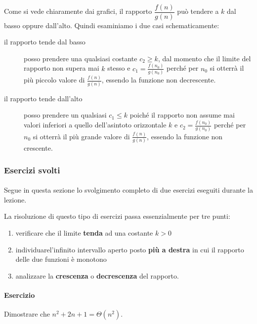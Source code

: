 \documentclass[11pt,a4paper,oneside]{article}
\begin{document}
\paragraph*{}Come si vede chiaramente dai grafici, il rapporto $\dfrac{f(n)}{g(n)}$ può tendere a $k$ dal basso oppure dall'alto. Quindi esaminiamo i due casi schematicamente:
\begin{description}
	\item[il rapporto tende dal basso] posso prendere una qualsiasi costante $c_2 \geq k$, dal momento che il limite del rapporto non supera mai $k$ stesso e $c_1 = \frac{f(n_0)}{g(n_0)}$ perché per $n_0$ si otterrà il più piccolo valore di $\frac{f(n)}{g(n)}$, essendo la funzione non decrescente.
	\item[il rapporto tende dall'alto] posso prendere un qualsiasi $c_1 \leq k$ poiché il rapporto non assume mai valori inferiori a quello dell'asintoto orizzontale $k$ e $c_2 = \frac{f(n_0)}{g(n_0)}$ perché per $n_0$ si otterrà il più grande valore di $\frac{f(n)}{g(n)}$, essendo la funzione non crescente.
\end{description}
\pagebreak
\subsubsection{Esercizi svolti}
\paragraph*{} Segue in questa sezione lo svolgimento completo di due esercizi eseguiti durante la lezione. 

\begin{tcolorbox}[title=Ricorda che...]
	La risoluzione di questo tipo di esercizi passa essenzialmente per tre punti:
	\begin{enumerate}
		\item verificare che il limite \textbf{tenda} ad una costante $k > 0$
		\item individuarel'infinito intervallo aperto posto \textbf{più a destra} in cui il rapporto delle due funzioni è monotono
		\item analizzare la \textbf{crescenza} o \textbf{decrescenza} del rapporto.
	\end{enumerate}
\end{tcolorbox}


\paragraph*{Esercizio} Dimostrare che $n^2+2n+1 = \Theta(n^2)$.
\end{document}
